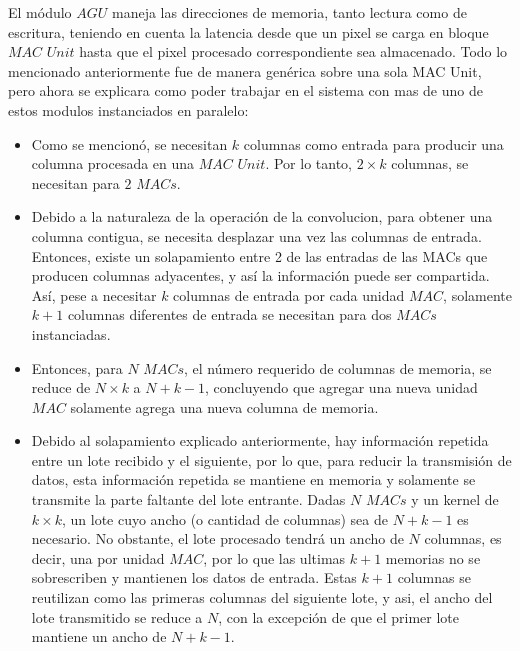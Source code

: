 \documentclass[]{IEEEphot}
\begin{document}
El módulo $AGU$ maneja las direcciones de memoria, tanto lectura como de escritura, teniendo en cuenta la latencia desde que un pixel se carga en bloque $MAC$ $Unit$ hasta que el pixel procesado correspondiente sea almacenado.
Todo lo mencionado anteriormente fue de manera genérica sobre una sola MAC Unit, pero ahora se explicara como poder trabajar en el sistema con mas de uno de estos modulos instanciados en paralelo:
\begin{frame}{}

    
      \begin{itemize}

\item Como se mencionó,  se necesitan $k$ columnas como entrada para producir una columna procesada en una $MAC$ $Unit$. Por lo tanto, $2 \times k$ columnas, se necesitan para $2$ $MACs$.
\item Debido a la naturaleza de la operación de la convolucion, para obtener una columna contigua, se necesita desplazar una vez las columnas de entrada. Entonces, existe un solapamiento entre 2 de las entradas de las MACs que producen columnas adyacentes, y así la información puede ser compartida.
Así, pese a necesitar $k$ columnas de entrada por cada unidad $MAC$, solamente $k+1$ columnas diferentes de entrada se necesitan para dos $MACs$ instanciadas.
\item Entonces, para $N$ $MACs$, el número requerido de columnas de memoria, se reduce de $N \times k$ a $N+k-1$, concluyendo que agregar una nueva unidad $MAC$ solamente agrega una nueva columna de memoria.
\item Debido al solapamiento explicado anteriormente, hay información repetida entre un lote recibido y el siguiente, por lo que, para reducir la transmisión de datos, esta información repetida se mantiene en memoria y solamente se transmite la parte faltante del lote entrante.
Dadas $N$ $MACs$ y  un kernel de $k \times k$, un lote cuyo ancho (o cantidad de columnas) sea de $N+k-1$ es necesario. No obstante, el lote procesado tendrá un ancho de  $N$ columnas, es decir, una por unidad $MAC$, por lo que las ultimas $k+1$ memorias no se sobrescriben y mantienen los datos de entrada. Estas $k+1$ columnas se reutilizan como las primeras columnas del siguiente lote, y asi, el ancho del lote transmitido se reduce a $N$, con la excepción de que el primer lote mantiene un ancho de $N+k-1$.

      \end{itemize}
     
\end{frame}
\end{document}
